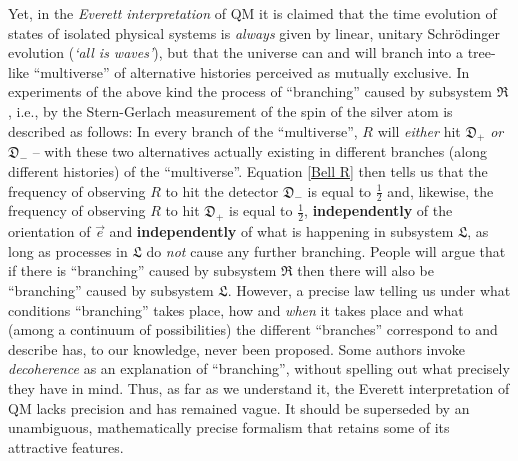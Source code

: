 \documentclass[a4paper,11pt]{article}
\begin{document}
Yet, in the \textit{Everett interpretation} of QM \cite{Everett} it is claimed that the time evolution of states of 
isolated physical systems is \textit{always} given by linear, unitary Schr\"odinger evolution (\textit{`all is waves'}), 
but that the universe can and will branch into a tree-like ``multiverse'' of alternative histories perceived as 
mutually exclusive. In experiments of the above kind the process of ``branching'' caused by subsystem $\mathfrak{R}$, 
i.e., by the Stern-Gerlach measurement of the spin of the silver atom is described as follows: In every branch 
of the ``multiverse'', $R$ will \textit{either} hit $\mathfrak{D}_{+}$ \textit{or} $\mathfrak{D}_{-}$ -- 
with these two alternatives actually existing in different branches (along different histories) of the 
``multiverse''.  Equation \eqref{Bell R} then tells us that the frequency of observing $R$ to hit the detector 
$\mathfrak{D}_{-}$ is equal to $\frac{1}{2}$ and, likewise, the frequency of observing 
$R$ to hit $\mathfrak{D}_{+}$ is equal to $\frac{1}{2}$, {\bf{independently}} of the orientation of $\vec{e}$ and 
{\bf{independently}} of what is happening in subsystem $\mathfrak{L}$, as long as processes in $\mathfrak{L}$ do 
\textit{not} cause any further branching. People will argue that if there is ``branching'' caused by subsystem 
$\mathfrak{R}$ then there will also be ``branching'' caused by subsystem $\mathfrak{L}$. However, a precise law 
telling us under what conditions ``branching'' takes place, how and \textit{when} it takes place and what (among 
a continuum of possibilities) the different ``branches'' correspond to and describe has, to our knowledge, never
been proposed. Some authors invoke \textit{decoherence} as an explanation of ``branching'', without spelling out 
what precisely they have in mind. Thus, as far as we understand it, the Everett interpretation of QM lacks precision 
and has remained vague. It should be superseded by an unambiguous, mathematically precise formalism that retains 
some of its attractive features. 
\end{document}
